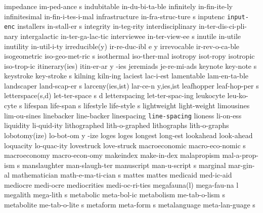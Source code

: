 \5 impedance		im-ped-ance s
\1 indubitable		in-du-bi-ta-ble		%
\1 infinitely		in-fin-ite-ly
\1 infinitesimal	in-fin-i-tes-i-mal
\5 infrastructure	in-fra-struc-ture s
\1 inputenc		{\tt input-enc}		%
\5 installers		in-stall-er s		%
\1 integrity		in-teg-rity		%
\1 interdisciplinary	in-ter-dis-ci-pli-nary
\1 intergalactic	in-ter-ga-lac-tic
\5 interviewee		in-ter-view-ee s	%
\1 inutile		in-utile
\1 inutility		in-util-i-ty
\3 irreducible(y)       ir-re-duc-ibl e y       %
\1 irrevocable		ir-rev-o-ca-ble
\5 isogeometric		iso-geo-met-ric s	%
\1 isothermal		iso-ther-mal		%
\1 isotropy		isot-ropy		%
\1 isotropic		iso-trop-ic		%
\3 itinerary(ies)	itin-er-ar y -ies
\1 jeremiads		je-re-mi-ads
\5 keynote		key-note s		%
\5 keystroke		key-stroke s
\1 kilning		kiln-ing
\1 laciest		lac-i-est
\1 lamentable		lam-en-ta-ble
\5 landscaper		land-scap-er s
\2 larceny(ies,ist) 	lar-ce-n y,ies,ist
\5 leafhopper		leaf-hop-per s	%
\NewWordtrue
\3 letterspace(s,d)	let-ter-space s d	%
\1 letterspacing	let-ter-spac-ing
\5 leukocyte	 	leu-ko-cyte s 		%
\5 lifespan		life-span s
\5 lifestyle		life-style s            %
\1 lightweight		light-weight
\1 limousines		lim-ou-sines
\1 linebacker		line-backer
\1 linespacing		{\tt\bs line-spacing}
\1 lioness		li-on-ess		%
\NewWordtrue
\1 liquidity		li-quid-ity		%
\1 lithographed		lith-o-graphed
\1 lithographs		lith-o-graphs
\3 lobotomy(ize)	lo-bot-om y -ize
\1 loges		loges
\1 longest		long-est
\NewWordtrue
\1 lookahead		look-ahead		%
\1 loquacity		lo-quac-ity          %
\1 lovestruck           love-struck		%
\5 macroeconomic	macro-eco-nomic s
\NewWordtrue
\1 macroeconomy		macro-econ-omy		%
\1 makeindex		make-in-dex		%
\5 malapropism		mal-a-prop-ism s
\1 manslaughter		man-slaugh-ter		%
\5 manuscript		man-u-script s
\1 marginal		mar-gin-al
\5 mathematician	math-e-ma-ti-cian s
\1 mattes		mattes
\1 medicaid		med-ic-aid
\1 mediocre		medi-ocre
\1 mediocrities		medi-oc-ri-ties
\NewWordtrue
\2 megafauna(l)		mega-fau-na l		%
\5 megalith		mega-lith s
\1 metabolic		meta-bol-ic
\5 metabolism		me-tab-o-lism s
\5 metabolite		me-tab-o-lite s
\5 metaform		meta-form s		%
\5 metalanguage		meta-lan-guage s
